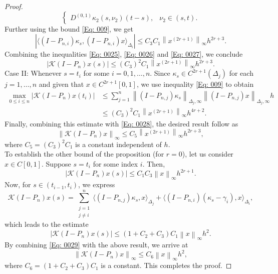 \documentclass[pdflatex, sn-mathphys-num]{sn-jnl}%
\newcommand{\norm}[1]{\left\lVert #1\right\rVert}
\theoremstyle{thmstyleone}%
\theoremstyle{thmstyletwo}%
\theoremstyle{thmstylethree}%
\begin{document}
\begin{proof}
\begin{equation*}
\begin{cases}
			D^{(0,1)} \kappa_2(s, \nu_2) (t - s), & \nu_2 \in (s, t).
		\end{cases}
	\end{equation*}
	Further using the bound \eqref{Eq: 009}, we get
	\begin{equation} \label{Eq: 0027}
		|\langle (I - P_{n,i}) \kappa_s, (I - P_{n,i}) x \rangle_{\Delta_i}| \leq C_3 C_1  \norm{x^{(2r+1)}}_\infty h^{2r+3}.
	\end{equation}
	Combining the inequalities \eqref{Eq: 0025}, \eqref{Eq: 0026} and \eqref{Eq: 0027}, we conclude
	\begin{equation} \label{Eq: 0028}
		|\mathcal{K}(I - P_n)x(s)| \leq (C_3)^2 C_1 \norm{x^{(2r+1)}}_\infty h^{2r+3}.
	\end{equation}
	\noindent
	Case II: Whenever $s = t_i$ for some $i = 0,1,\ldots,n$. Since $\kappa_s \in C^{2r+1}(\Delta_j)$ for each $j = 1, \ldots, n$ and given that $x \in C^{2r+1}[0,1]$, we use inequality \eqref{Eq: 009} to obtain
	\begin{align*} 
		\max_{0 \leq i \leq n} |\mathcal{K}(I - P_n)x(t_i)| 
		&\leq \sum_{j=1}^{n} \norm{(I - P_{n,j})\kappa_s}_{\Delta_j, \infty} \norm{(I - P_{n,j})x}_{\Delta_j, \infty} h \\
		&\leq (C_3)^2 C_1 \norm{x^{(2r+1)}}_\infty h^{4r+2}.
	\end{align*}
	Finally, combining this estimate with \eqref{Eq: 0028}, the desired result follow as
	\begin{equation*}
		\norm{\mathcal{K}(I-P_n)x }_\infty \leq C_5 \norm{x^{(2r+1)}}_{ \infty} h^{2r + 3},
	\end{equation*}
	where $C_5 = (C_3)^2 C_1 $ is a constant independent of $h$.\\
	To establish the other bound of the proposition (for \(r = 0\)), let us consider $x \in C[0,1]$. Suppose $s = t_i$ for some index $i$. Then,
	\begin{equation} \label{Eq: 0029}
		\left| \mathcal{K}(I - P_n)x(s) \right| \leq C_1 C_3 \norm{x}_\infty h^{2r+1}.
	\end{equation}
	Now, for $s \in (t_{i-1}, t_i)$, we express
	\begin{equation*}
		\mathcal{K}(I - P_n)x(s) =\sum_{\substack{j=1 \\  j\ne i} }^{n} \langle (I - P_{n,j}) \kappa_s,  x \rangle_{\Delta_j} + \langle (I - P_{n,i}) (\kappa_s - \gamma_i),x \rangle_{\Delta_i},
	\end{equation*}
	which leads to the estimate
	\begin{equation*}
		\left| \mathcal{K}(I - P_n)x(s) \right| \leq (1 +C_2 + C_3) C_1 \norm{x}_\infty h^2.
	\end{equation*}
	By combining \eqref{Eq: 0029} with the above result, we arrive at
	\begin{equation*}
		\norm{\mathcal{K}(I - P_n)x}_\infty \leq C_6 \norm{x}_\infty h^2,
	\end{equation*}
	where $C_6 = (1 +C_2 + C_3) C_1$ is a constant. This completes the proof.
\end{proof}
\end{document}
